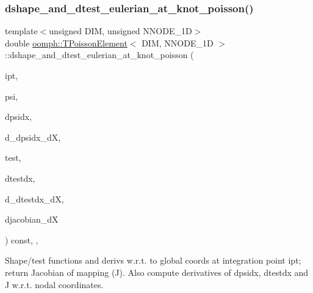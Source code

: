 \mbox{\label{classoomph_1_1TPoissonElement_af4a23d9088cdc834530545fd554ab906}} 
\subsubsection{\texorpdfstring{dshape\+\_\+and\+\_\+dtest\+\_\+eulerian\+\_\+at\+\_\+knot\+\_\+poisson()}{dshape\_and\_dtest\_eulerian\_at\_knot\_poisson()}\hspace{0.1cm}{\footnotesize\ttfamily [2/2]}}
{\footnotesize\ttfamily template$<$unsigned D\+IM, unsigned N\+N\+O\+D\+E\+\_\+1D$>$ \\
double \hyperlink{classoomph_1_1TPoissonElement}{oomph\+::\+T\+Poisson\+Element}$<$ D\+IM, N\+N\+O\+D\+E\+\_\+1D $>$\+::dshape\+\_\+and\+\_\+dtest\+\_\+eulerian\+\_\+at\+\_\+knot\+\_\+poisson (\begin{DoxyParamCaption}\item[{const unsigned \&}]{ipt,  }\item[{\hyperlink{classoomph_1_1Shape}{Shape} \&}]{psi,  }\item[{\hyperlink{classoomph_1_1DShape}{D\+Shape} \&}]{dpsidx,  }\item[{\hyperlink{classoomph_1_1RankFourTensor}{Rank\+Four\+Tensor}$<$ double $>$ \&}]{d\+\_\+dpsidx\+\_\+dX,  }\item[{\hyperlink{classoomph_1_1Shape}{Shape} \&}]{test,  }\item[{\hyperlink{classoomph_1_1DShape}{D\+Shape} \&}]{dtestdx,  }\item[{\hyperlink{classoomph_1_1RankFourTensor}{Rank\+Four\+Tensor}$<$ double $>$ \&}]{d\+\_\+dtestdx\+\_\+dX,  }\item[{\hyperlink{classoomph_1_1DenseMatrix}{Dense\+Matrix}$<$ double $>$ \&}]{djacobian\+\_\+dX }\end{DoxyParamCaption}) const\hspace{0.3cm}{\ttfamily [inline]}, {\ttfamily [protected]}, {\ttfamily [virtual]}}



Shape/test functions and derivs w.\+r.\+t. to global coords at integration point ipt; return Jacobian of mapping (J). Also compute derivatives of dpsidx, dtestdx and J w.\+r.\+t. nodal coordinates. 

